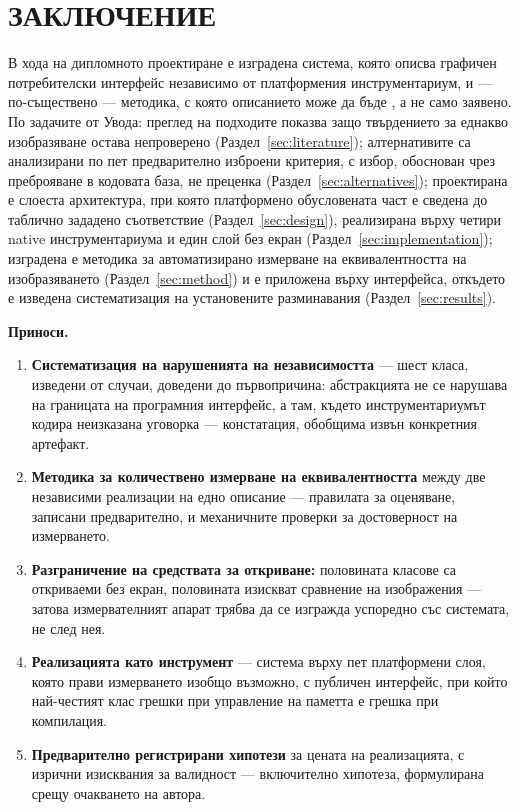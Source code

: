 \section*{ЗАКЛЮЧЕНИЕ}
\label{sec:conclusion}

В хода на дипломното проектиране е изградена система, която описва графичен потребителски
интерфейс независимо от платформения инструментариум, и --- по-съществено --- методика, с която
описанието може да бъде , а не само заявено. По задачите от Увода: преглед на
подходите показва защо твърдението за еднакво изобразяване остава непроверено
(Раздел~\ref{sec:literature}); алтернативите са анализирани по пет предварително изброени
критерия, с избор, обоснован чрез преброяване в кодовата база, не преценка
(Раздел~\ref{sec:alternatives}); проектирана е слоеста архитектура, при която платформено
обусловената част е сведена до таблично зададено съответствие (Раздел~\ref{sec:design}),
реализирана върху четири native инструментариума и един слой без екран
(Раздел~\ref{sec:implementation}); изградена е методика за автоматизирано измерване на
еквивалентността на изобразяването (Раздел~\ref{sec:method}) и е приложена върху \boardPages{}
интерфейса, откъдето е изведена систематизация на установените разминавания
(Раздел~\ref{sec:results}).

\textbf{Приноси.}
\begin{enumerate}[topsep=2pt,itemsep=2pt,leftmargin=*]
\item \textbf{Систематизация на нарушенията на независимостта} --- шест класа, изведени от случаи,
      доведени до първопричина: абстракцията не се нарушава на границата на програмния
      интерфейс, а там, където инструментариумът кодира неизказана уговорка --- констатация,
      обобщима извън конкретния артефакт.
\item \textbf{Методика за количествено измерване на еквивалентността} между две независими
      реализации на едно описание --- правилата за оценяване, записани предварително, и
      механичните проверки за достоверност на измерването.
\item \textbf{Разграничение на средствата за откриване:} половината класове са откриваеми без
      екран, половината изискват сравнение на изображения --- затова измервателният апарат трябва
      да се изгражда успоредно със системата, не след нея.
\item \textbf{Реализацията като инструмент} --- система върху пет платформени слоя, която прави
      измерването изобщо възможно, с публичен интерфейс, при който най-честият клас грешки при
      управление на паметта е грешка при компилация.
\item \textbf{Предварително регистрирани хипотези} за цената на реализацията, с изрични изисквания
      за валидност --- включително хипотеза, формулирана срещу очакването на автора.
\end{enumerate}


